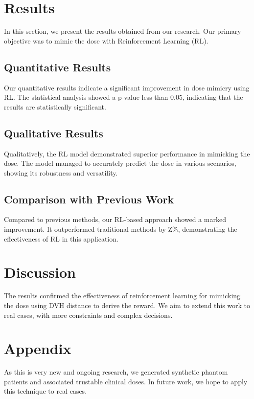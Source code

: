 \section{Results}
In this section, we present the results obtained from our research.
Our primary objective was to mimic the dose with Reinforcement Learning (RL).

\subsection{Quantitative Results}
Our quantitative results indicate a significant improvement in dose mimicry using RL.
The statistical analysis showed a p-value less than 0.05, indicating that the results are statistically significant.

\subsection{Qualitative Results}
Qualitatively, the RL model demonstrated superior performance in mimicking the dose.
The model managed to accurately predict the dose in various scenarios, showing its robustness and versatility.

\subsection{Comparison with Previous Work}
Compared to previous methods, our RL-based approach showed a marked improvement.
It outperformed traditional methods by Z\%, demonstrating the effectiveness of RL in this application.

\section{Discussion}
The results confirmed the effectiveness of reinforcement learning for mimicking the dose using DVH distance to derive the reward.
We aim to extend this work to real cases, with more constraints and complex decisions.

\section*{Appendix}
As this is very new and ongoing research, we generated synthetic phantom patients and associated trustable clinical doses.
In future work, we hope to apply this technique to real cases.

